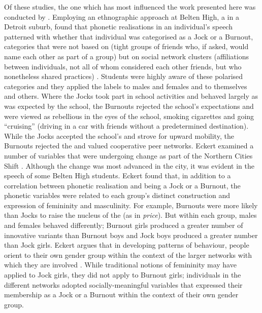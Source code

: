 Of these studies, the one which has most influenced the work presented here was conducted by \citet{eckert1989,eckert2000}. Employing an ethnographic approach at Belten High, a  in a Detroit suburb, \citet{eckert1989,eckert2000} found that pho\-ne\-tic realisations in an individual's speech patterned with whe\-ther that individual was ca\-tegorised as a Jock or a Burnout, categories that were not based on  (tight groups of friends who, if asked, would name each other as part of a group) but on social network clusters (affiliations between individuals, not all of whom considered each other friends, but who nonetheless shared practices) \citep[11]{eckert2005}. Students were highly aware of these polarised categories and they applied the labels to males and females and to themselves and others. Where the Jocks took part in school activities and behaved largely as was expected by the school, the Burnouts rejected the school's expectations and were viewed as rebellious in the eyes of the school, smoking cigarettes and going ``cruising'' (driving in a car with friends without a predetermined destination). While the Jocks accepted the school's  and strove for upward mobility, the Burnouts rejected the  and valued cooperative peer networks. Eckert examined a number of variables that were undergoing change as part of the Northern Cities Shift \citep{labovyaegersteiner1972}. Although the change was most advanced in the city, it was evident in the speech of some Belten High students. Eckert found that, in addition to a correlation between phonetic realisation and being a Jock or a Burnout, the phonetic variables were related to each group's distinct construction and expression of femininity and masculinity. For example, Burnouts were more likely than Jocks to raise the nucleus of the   (as in \textit{price}). But within each group, males and females behaved differently; Burnout girls produced a greater number of innovative variants than Burnout boys and Jock boys produced a greater number than Jock girls. Eckert argues that in developing patterns of behaviour, people orient to their own gender group within the context of the larger networks with which they are involved \citep[122-123]{eckert2000}. While traditional notions of femininity may have applied to Jock girls, they did not apply to Burnout girls; individuals in the different networks adopted socially-meaningful variables that expressed their membership as a Jock or a Burnout within the context of their own gender group. 

